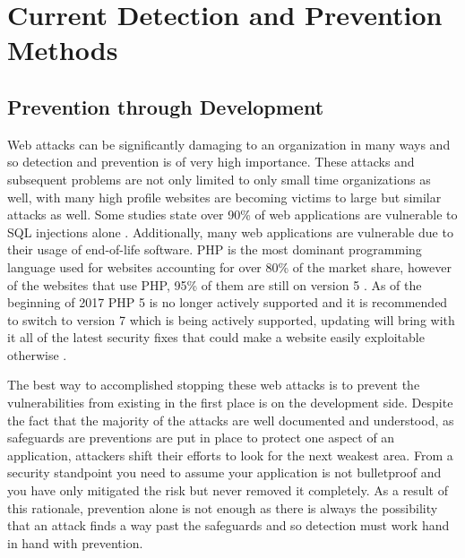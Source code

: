 \chapter{Current Detection and Prevention Methods} \label{sec:sectionThree}

\section{Prevention through Development} \label{sec:preventDevel}

Web attacks can be significantly damaging to an organization in many ways and so detection and prevention is of very high importance.  These attacks and subsequent problems are not only limited to only small time organizations as well, with many high profile websites are becoming victims to large but similar attacks as well.  Some studies state over 90\% of web applications are vulnerable to SQL injections alone \cite{detectionAndPreventionSQL}.  Additionally, many web applications are vulnerable due to their usage of end-of-life software.  PHP is the most dominant programming language used for websites accounting for over 80\% of the market share, however of the websites that use PHP, 95\% of them are still on version 5 \cite{phpStats}.  As of the beginning of 2017 PHP 5 is no longer actively supported and it is recommended to switch to version 7 which is being actively supported, updating will bring with it all of the latest security fixes that could make a website easily exploitable otherwise \cite{phpVersions, wordpress}.

The best way to accomplished stopping these web attacks is to prevent the vulnerabilities from existing in the first place is on the development side.  Despite the fact that the majority of the attacks are well documented and understood, as safeguards are preventions are put in place to protect one aspect of an application, attackers shift their efforts to look for the next weakest area.  From a security standpoint you need to assume your application is not bulletproof and you have only mitigated the risk but never removed it completely.  As a result of this rationale, prevention alone is not enough as there is always the possibility that an attack finds a way past the safeguards and so detection must work hand in hand with prevention.

